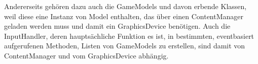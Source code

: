 Andererseits gehören dazu auch die GameModels und davon erbende Klassen, weil diese eine Instanz von Model enthalten, das über einen ContentManager geladen werden muss und damit ein GraphicsDevice benötigen. Auch die InputHandler, deren hauptsächliche Funktion es ist, in bestimmten, eventbasiert aufgerufenen Methoden, Listen von GameModels zu erstellen, sind damit von ContentManager und vom GraphicsDevice abhängig.
~\\

















